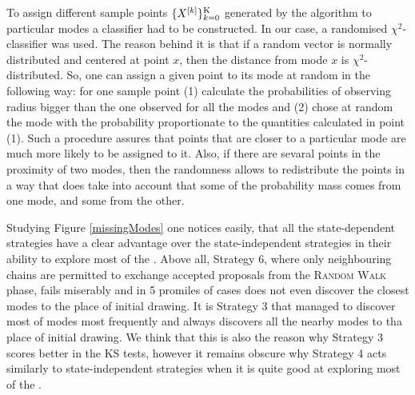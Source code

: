 \documentclass{book}
\begin{document}
To assign different sample points $\{ X^{[k]}\}_{k = 0}^{\mathrm{K}}$ generated by the algorithm to particular modes a classifier had to be constructed. In our case, a randomised $\chi^2$-classifier was used. The reason behind it is that if a random vector is normally distributed and centered at point $x$, then the distance from mode $x$ is $\chi^2$-distributed. So, one can assign a given point to its mode at random in the following way: for one sample point (1) calculate the probabilities of observing radius bigger than the one observed for all the modes and (2) chose at random the mode with the probability proportionate to the quantities calculated in point (1). Such a procedure assures that points that are closer to a particular mode are much more likely to be assigned to it. Also, if there are sevaral points in the proximity of two modes, then the randomness allows to redistribute the points in a way that does take into account that some of the probability mass comes from one mode, and some from the other.   

Studying Figure \ref{missingModes} one notices easily, that all the state-dependent strategies have a clear advantage over the state-independent strategies in their ability to explore most of the \sspace. Above all, Strategy 6, where only neighbouring chains are permitted to exchange accepted proposals from the \textsc{Random Walk} phase, fails miserably and in 5 promiles of cases does not even  discover the closest modes to the place of initial drawing. It is Strategy 3 that managed to discover most of modes most frequently and always discovers all the nearby modes to tha place of initial drawing. We think that this is also the reason why Strategy 3 scores better in the KS tests, however it remains obscure why Strategy 4 acts similarly to state-independent strategies when it is quite good at exploring most of the \sspace. 
\end{document}
